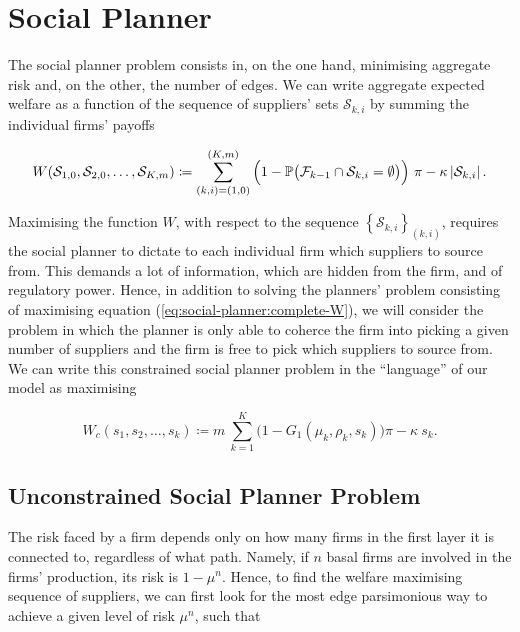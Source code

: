 \documentclass[../../main.tex]{subfiles}
\begin{document}
\section{Social Planner}

The social planner problem consists in, on the one hand, minimising aggregate risk and, on the other, the number of edges. We can write aggregate expected welfare as a function of the sequence of suppliers' sets $\mathcal{S}_{k, i}$ by summing the individual firms' payoffs

\begin{equation} \label{eq:social-planner:complete-W}
  W(\mathcal{S}_{1, 0}, \mathcal{S}_{2, 0}, \ldots, \mathcal{S}_{K, m}) \coloneqq \sum^{(K, m)}_{(k, i) = (1, 0)} \Big(1 - \P\big( \mathcal{F}_{k - 1} \cap \mathcal{S}_{k, i} = \emptyset \big) \Big) \ \pi  - \kappa \abs{\mathcal{S}_{k, i} }.
\end{equation}

Maximising the function $W$, with respect to the sequence $\left\{ \mathcal{S}_{k, i}\right\}_{(k, i)}$, requires the social planner to dictate to each individual firm which suppliers to source from. This demands a lot of information, which are hidden from the firm, and of regulatory power. Hence, in addition to solving the planners' problem consisting of maximising equation (\ref{eq:social-planner:complete-W}), we will consider the problem in which the planner is only able to coherce the firm into picking a given number of suppliers and the firm is free to pick which suppliers to source from. We can write this constrained social planner problem in the ``language'' of our model as maximising

\begin{equation}
  W_c(s_1, s_2, \ldots, s_k) \coloneqq m \ \sum^{K}_{k = 1} \Big(1 - G_1(\mu_k, \rho_k, s_k)\Big) \pi - \kappa \  s_k.
\end{equation}

\subsection{Unconstrained Social Planner Problem} \label{sec:planner:unconstrained}

The risk faced by a firm depends only on how many firms in the first layer it is connected to, regardless of what path. Namely, if $n$ basal firms are involved in the firms' production, its risk is $1 - \mu^n$. Hence, to find the welfare maximising sequence of suppliers, we can first look for the most edge parsimonious way to achieve a given level of risk $\mu^n$, such that
\end{document}
